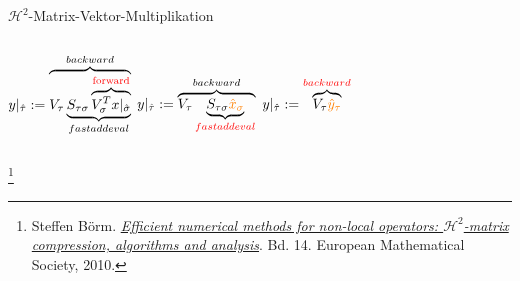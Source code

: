 \documentclass[10pt]{beamer}
\let\svthefootnote\thefootnote
\begin{document}
\begin{frame}{\(\mathcal{H}^2\)-Matrix-Vektor-Multiplikation}

  \begin{columns}
      \( y|_{\hat{\tau}} := \overbrace{V_{\tau} \underbrace{S_{\tau \sigma}
        \overbrace{V_{\sigma}^T
        x|_{\hat{\sigma}}}^{\textcolor{red}{\text{forward}}}}_{fastaddeval}}^{backward} \)
      \( y|_{\hat{\tau}} := \overbrace{V_{\tau} \underbrace{S_{\tau \sigma}
         \textcolor{orange}{\hat{x}_\sigma}}_{\textcolor{red}{fastaddeval}}}^{backward} \)
      \( y|_{\hat{\tau}} := \overbrace{V_{\tau}
         \textcolor{orange}{\hat{y}_\tau}}^{\textcolor{red}{backward}} \)
  \end{columns}
  \footnotesize
  \let\thefootnote\relax\footnote{Steffen B{\"o}rm.
  \href{https://books.google.de/books/about/Efficient_Numerical_Methods_for_Non_loca.html?id=awMabNC9DTkC&redir_esc=y}
  {\textit{Efficient numerical methods for non-local operators: \(
   \mathcal{H}^{2} \)-matrix compression, algorithms and analysis}}. Bd. 14.  
   European Mathematical Society, 2010.}
  \addtocounter{footnote}{-1}\let\thefootnote\svthefootnote\relax
  \normalsize
\end{frame}
\end{document}
